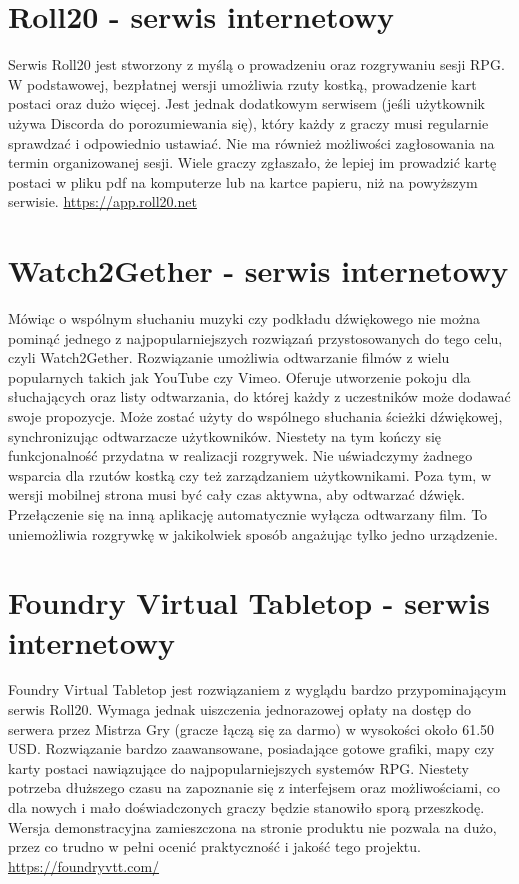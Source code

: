 \documentclass[shortabstract,inz]{iithesis}
\begin{document}
		\section{Roll20 - serwis internetowy}
		Serwis Roll20 jest stworzony z myślą o prowadzeniu oraz rozgrywaniu sesji RPG. W podstawowej, bezpłatnej wersji umożliwia rzuty kostką, prowadzenie kart postaci oraz dużo więcej. Jest jednak dodatkowym serwisem (jeśli użytkownik używa Discorda do porozumiewania się), który każdy z graczy musi regularnie sprawdzać i odpowiednio ustawiać. Nie ma również możliwości zagłosowania na termin organizowanej sesji. Wiele graczy zgłaszało, że lepiej im prowadzić kartę postaci w pliku pdf na komputerze lub na kartce papieru, niż na powyższym serwisie. \url{https://app.roll20.net}
		\section{Watch2Gether - serwis internetowy}
		Mówiąc o wspólnym słuchaniu muzyki czy podkładu dźwiękowego nie można pominąć jednego z najpopularniejszych rozwiązań przystosowanych do tego celu, czyli Watch2Gether. Rozwiązanie umożliwia odtwarzanie filmów z wielu popularnych takich jak YouTube czy Vimeo. Oferuje utworzenie pokoju dla słuchających oraz listy odtwarzania, do której każdy z uczestników może dodawać swoje propozycje. Może zostać użyty do wspólnego słuchania ścieżki dźwiękowej, synchronizując odtwarzacze użytkowników. Niestety na tym kończy się funkcjonalność przydatna w realizacji rozgrywek. Nie uświadczymy żadnego wsparcia dla rzutów kostką czy też zarządzaniem użytkownikami. Poza tym, w wersji mobilnej strona musi być cały czas aktywna, aby odtwarzać dźwięk. Przełączenie się na inną aplikację automatycznie wyłącza odtwarzany film. To uniemożliwia rozgrywkę w jakikolwiek sposób angażując tylko jedno urządzenie. 
		\section{Foundry Virtual Tabletop - serwis internetowy}
		Foundry Virtual Tabletop jest rozwiązaniem z wyglądu bardzo przypominającym serwis Roll20. Wymaga jednak uiszczenia jednorazowej opłaty na dostęp do serwera przez Mistrza Gry (gracze łączą się za darmo) w wysokości około 61.50 USD. Rozwiązanie bardzo zaawansowane, posiadające gotowe grafiki, mapy czy karty postaci nawiązujące do najpopularniejszych systemów RPG. Niestety potrzeba dłuższego czasu na zapoznanie się z interfejsem oraz możliwościami, co dla nowych i mało doświadczonych graczy będzie stanowiło sporą przeszkodę. Wersja demonstracyjna zamieszczona na stronie produktu nie pozwala na dużo, przez co trudno w pełni ocenić praktyczność i jakość tego projektu. \url{https://foundryvtt.com/}
		
\end{document}
